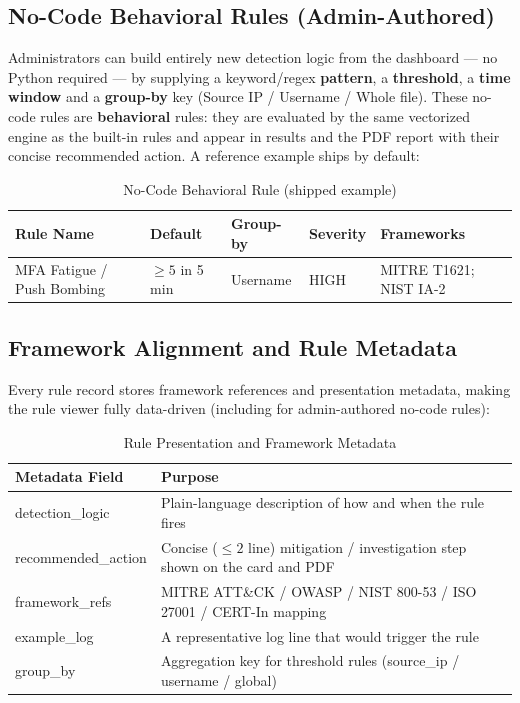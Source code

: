 \documentclass[12pt,a4paper]{article}
\begin{document}
\subsection{No-Code Behavioral Rules (Admin-Authored)}

Administrators can build entirely new detection logic from the dashboard --- no Python
required --- by supplying a keyword/regex \textbf{pattern}, a \textbf{threshold}, a
\textbf{time window} and a \textbf{group-by} key (Source IP / Username / Whole file). These
no-code rules are \textbf{behavioral} rules: they are evaluated by the same vectorized engine
as the built-in rules and appear in results and the PDF report with their concise recommended
action. A reference example ships by default:

\begin{table}[H]
\centering
\begin{tabular}{|p{3.7cm}|p{3.0cm}|p{2.1cm}|p{1.7cm}|p{3.0cm}|}
\hline
\textbf{Rule Name} & \textbf{Default} & \textbf{Group-by} & \textbf{Severity} & \textbf{Frameworks} \\
\hline
MFA Fatigue / Push Bombing & $\geq 5$ in 5 min & Username & HIGH & MITRE T1621; NIST IA-2 \\
\hline
\end{tabular}
\caption{No-Code Behavioral Rule (shipped example)}
\label{tab:custom-rules}
\end{table}

\subsection{Framework Alignment and Rule Metadata}

Every rule record stores framework references and presentation metadata, making the rule
viewer fully data-driven (including for admin-authored no-code rules):

\begin{table}[H]
\centering
\begin{tabular}{|p{4cm}|p{10cm}|}
\hline
\textbf{Metadata Field} & \textbf{Purpose} \\
\hline
detection\_logic & Plain-language description of how and when the rule fires \\
\hline
recommended\_action & Concise ($\leq 2$ line) mitigation / investigation step shown on the card and PDF \\
\hline
framework\_refs & MITRE ATT\&CK / OWASP / NIST 800-53 / ISO 27001 / CERT-In mapping \\
\hline
example\_log & A representative log line that would trigger the rule \\
\hline
group\_by & Aggregation key for threshold rules (source\_ip / username / global) \\
\hline
\end{tabular}
\caption{Rule Presentation and Framework Metadata}
\label{tab:rule-metadata}
\end{table}
\end{document}
